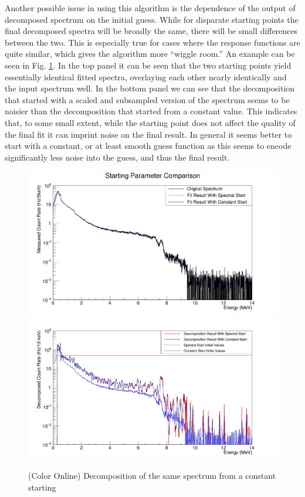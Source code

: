 \documentclass[5p]{elsarticle}
\begin{document}
Another possible issue in using this algorithm is the dependence of the output of decomposed spectrum on the initial guess. While for disparate starting points the final decomposed spectra will be broadly the same, there will be small differences between the two. This is especially true for cases where the response functions are quite similar, which gives the algorithm more ``wiggle room.'' An example can be seen in Fig. \ref{fig-decomp-starting-pts}. In the top panel it can be seen that the two starting points yield essentially identical fitted spectra, overlaying each other nearly identically and the input spectrum well. In the bottom panel we can see that the decomposition that started with a scaled and subsampled version of the spectrum seems to be noisier than the decomposition that started from a constant value. This indicates that, to some small extent, while the starting point does not affect the quality of the final fit it can imprint noise on the final result. In general it seems better to start with a constant, or at least smooth guess function as this seems to encode significantly less noise into the guess, and thus the final result.

\begin{figure}[h]
\begin{center}
\includegraphics[width=\linewidth]{Start_Fit_Comp_png}
\includegraphics[width=\linewidth]{Start_Decomp_Comp_png}
\caption{(Color Online) Decomposition of the same spectrum from a constant starting}
\label{fig-decomp-starting-pts}
\end{center}
\end{figure}
\end{document}

